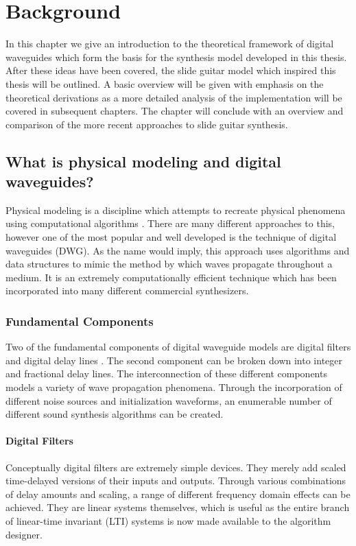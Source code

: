 \documentclass[main.tex]{subfiles}
\begin{document}
\chapter{Background}
In this chapter we give an introduction to the theoretical framework of digital waveguides which form the basis for the synthesis model developed in this thesis. After these ideas have been covered, the slide guitar model which inspired this thesis will be outlined. A basic overview will be given with emphasis on the theoretical derivations as a more detailed analysis of the implementation will be covered in subsequent chapters. The chapter will conclude with an overview and comparison of the more recent approaches to slide guitar synthesis.

\section{What is physical modeling and digital waveguides?}
Physical modeling is a discipline which attempts to recreate physical phenomena using computational algorithms . There are many different approaches to this, however one of the most popular and well developed is the technique of digital waveguides (DWG). As the name would imply, this approach uses algorithms and data structures to mimic the method by which waves propagate throughout a medium. It is an extremely computationally efficient technique which has been incorporated into many different commercial synthesizers.

\subsection{Fundamental Components}
Two of the fundamental components of digital waveguide models are digital filters and digital delay lines . The second component can be broken down into integer and fractional delay lines. The interconnection of these different components models a variety of wave propagation phenomena. Through the incorporation of different noise sources and initialization waveforms, an enumerable number of different sound synthesis algorithms can be created.

\subsubsection{Digital Filters}
Conceptually digital filters are extremely simple devices. They merely add scaled time-delayed versions of their inputs and outputs. Through various combinations of delay amounts and scaling, a range of different frequency domain effects can be achieved. They are linear systems themselves, which is useful as the entire branch of linear-time invariant (LTI) systems is now made available to the algorithm designer.
\end{document}
